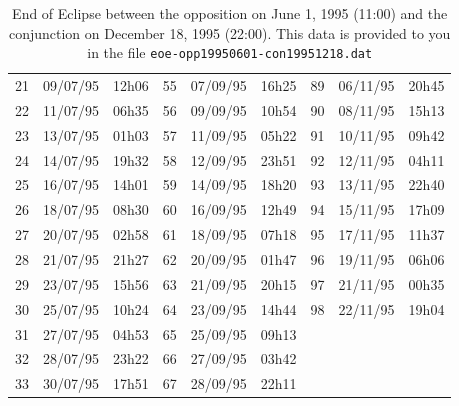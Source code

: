 \documentclass{tufte-handout}
\begin{document}
\begin{table}
\begin{tabular}{lll|lll|lll}
21 & 09/07/95 & 12h06 & 55 & 07/09/95 & 16h25 & 89 & 06/11/95 & 20h45\\
22 & 11/07/95 & 06h35 & 56 & 09/09/95 & 10h54 & 90 & 08/11/95 & 15h13\\
23 & 13/07/95 & 01h03 & 57 & 11/09/95 & 05h22 & 91 & 10/11/95 & 09h42\\
24 & 14/07/95 & 19h32 & 58 & 12/09/95 & 23h51 & 92 & 12/11/95 & 04h11\\
25 & 16/07/95 & 14h01 & 59 & 14/09/95 & 18h20 & 93 & 13/11/95 & 22h40\\
26 & 18/07/95 & 08h30 & 60 & 16/09/95 & 12h49 & 94 & 15/11/95 & 17h09\\
27 & 20/07/95 & 02h58 & 61 & 18/09/95 & 07h18 & 95 & 17/11/95 & 11h37\\
28 & 21/07/95 & 21h27 & 62 & 20/09/95 & 01h47 & 96 & 19/11/95 & 06h06\\
29 & 23/07/95 & 15h56 & 63 & 21/09/95 & 20h15 & 97 & 21/11/95 & 00h35\\
30 & 25/07/95 & 10h24 & 64 & 23/09/95 & 14h44 & 98 & 22/11/95 & 19h04\\
31 & 27/07/95 & 04h53 & 65 & 25/09/95 & 09h13 & & &\\
32 & 28/07/95 & 23h22 & 66 & 27/09/95 & 03h42 & & &\\
33 & 30/07/95 & 17h51 & 67 & 28/09/95 & 22h11 & & &\\
\end{tabular}
\caption{End of Eclipse between the opposition on June 1, 1995 (11:00) and the conjunction on December 18, 1995 (22:00). This data is provided to you in the file {\tt eoe-opp19950601-con19951218.dat}}
\end{table}
\end{document}
